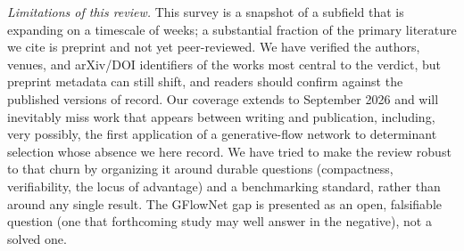 \documentclass[onecolumn,a4paper]{quantumarticle}
\begin{document}
\emph{Limitations of this review.} This survey is a snapshot of a subfield that is expanding on a timescale of weeks; a substantial fraction of the primary literature we cite is preprint and not yet peer-reviewed. We have verified the authors, venues, and arXiv/DOI identifiers of the works most central to the verdict, but preprint metadata can still shift, and readers should confirm against the published versions of record. Our coverage extends to September 2026 and will inevitably miss work that appears between writing and publication, including, very possibly, the first application of a generative-flow network to determinant selection whose absence we here record. We have tried to make the review robust to that churn by organizing it around durable questions (compactness, verifiability, the locus of advantage) and a benchmarking standard, rather than around any single result. The GFlowNet gap is presented as an open, falsifiable question (one that forthcoming study may well answer in the negative), not a solved one.
\end{document}
